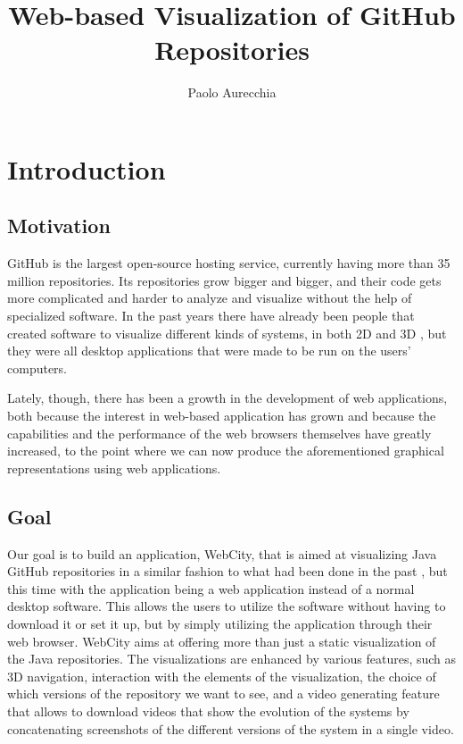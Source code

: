 \documentclass[]{usiinfbachelorproject}
\author{Paolo Aurecchia}
\title{Web-based Visualization of GitHub Repositories}
\subtitle{}
\begin{document}
\maketitle

\tableofcontents
\pagebreak

\section{Introduction} \label{introduction}

\subsection{Motivation} \label{Motivation}
GitHub is the largest open-source hosting service, currently having more than 35 million repositories. Its repositories grow bigger and bigger, and their code gets more complicated and harder to analyze and visualize without the help of specialized software. In the past years there have already been people that created software to visualize different kinds of systems, in both 2D and 3D \cite{Wett07b} \cite{Wett2008b} \cite{Wett2008a}, but they were all desktop applications that were made to be run on the users' computers.

Lately, though, there has been a growth in the development of web applications, both because the interest in web-based application has grown and because the capabilities and the performance of the web browsers themselves have greatly increased, to the point where we can now produce the aforementioned graphical representations using web applications.

\subsection{Goal} \label{Goal}
Our goal is to build an application, WebCity, that is aimed at visualizing Java GitHub repositories in a similar fashion to what had been done in the past \cite{Wett07b} \cite{Wett2008b} \cite{Wett2008a}, but this time with the application being a web application instead of a normal desktop software. This allows the users to utilize the software without having to download it or set it up, but by simply utilizing the application through their web browser.
WebCity aims at offering more than just a static visualization of the Java repositories. The visualizations are enhanced by various features, such as 3D navigation, interaction with the elements of the visualization, the choice of which versions of the repository we want to see, and a video generating feature that allows to download videos that show the evolution of the systems by concatenating screenshots of the different versions of the system in a single video.
\end{document}
